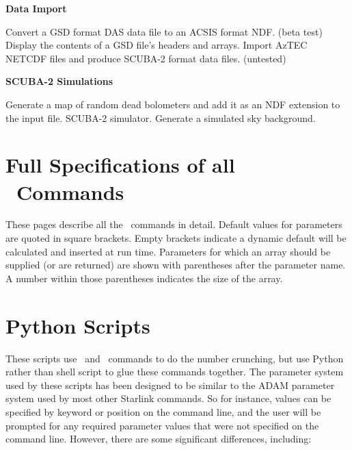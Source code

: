 \documentclass[oneside,11pt]{starlink}
\begin{document}
{\large
\begin{center}
\textbf{Data Import}
\end{center}
}

\begin{description}[itemsep=0.pt]
 Convert a GSD format DAS data file to an ACSIS format NDF. (beta test)
 Display the contents of a GSD file's headers and arrays.
 Import AzTEC NETCDF files and produce SCUBA-2 format data files. (untested)
\end{description}

{\large
\begin{center}
\textbf{SCUBA-2 Simulations}
\end{center}
}

\begin{description}[itemsep=0.pt]
 Generate a map of random dead bolometers and add it as an NDF extension to the input file.
SCUBA-2 simulator.
 Generate a simulated sky background.
\end{description}

\fi

\section{Full Specifications of all \SMURF\ Commands\label{ap:full}}

These pages describe all the \SMURF\ commands in detail. Default
values for parameters are quoted in square brackets. Empty brackets
indicate a dynamic default will be calculated and inserted at run
time. Parameters for which an array should be supplied (or are
returned) are shown with parentheses after the parameter name. A
number within those parentheses indicates the size of the array.




\clearpage

\section{Python Scripts}

These scripts use \KAPPA\ and \SMURF\ commands to do the number
crunching, but use Python rather than shell script to glue these commands
together. The parameter system used by these scripts has been designed to
be similar to the ADAM parameter system used by most other Starlink
commands. So for instance, values can be specified by keyword or position
on the command line, and the user will be prompted for any required parameter
values that were not specified on the command line. However, there are some
significant differences, including:
\end{document}
